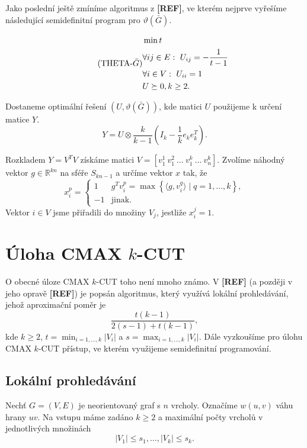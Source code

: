 Jako poslední ještě zmíníme algoritmus z \textbf{[REF]}, ve kterém nejprve vyřešíme následující semidefinitní program pro $\vartheta(\bar{G})$.

\begin{equation}\tag{THETA-$\bar{G}$}
    \begin{split}
        &\min t \\
        &\forall ij \in E:\ U_{ij} = -\frac{1}{t - 1} \\
        &\forall i \in V:\ U_{ii} = 1 \\
        &U \succeq 0, k \geq 2.
    \end{split}
    \label{eq:THETA-BAR-G}
\end{equation}

\noindent Dostaneme optimální řešení $(U, \vartheta(\bar{G}))$, kde matici $U$ použijeme k určení matice $Y$.
$$
    Y = U \otimes \frac{k}{k - 1} \left( I_k - \frac{1}{k} e_k e_k^T \right).
$$

\noindent Rozkladem $Y = V^TV$ získáme matici $V = \left[ v_1^1\ v_1^2\ \dots\ v_1^k\ \dots\ v_n^k \right]$.
Zvolíme náhodný vektor $g \in \mathbb{R}^{kn}$ na sféře $S_{kn-1}$ a určíme vektor $x$ tak, že
$$
    x_i^p = 
    \begin{cases}
        1  & g^T v_i^p = \max \left\{ \langle g, v_i^q \rangle \mid q = 1, \dots, k \right\}, \\
        -1 & \text{jinak.}
    \end{cases}
$$
Vektor $i \in V$ jsme přiřadili do množiny $V_j$, jestliže $x_i^j = 1$.


\section{Úloha CMAX $k$-CUT}

O obecné úloze CMAX $k$-CUT toho není mnoho známo. V \textbf{[REF]} (a později v jeho opravě \textbf{[REF]}) je popsán algoritmus, který využívá lokální prohledávání, jehož aproximační poměr je
$$
    \frac{t(k-1)}{2(s-1)+t(k-1)},
$$
kde $k\geq 2$, $t = \min_{i=1,\dots,k} |V_i|$ a $s = \max_{i=1,\dots,k} |V_i|$. Dále vyzkoušíme pro úlohu CMAX $k$-CUT přístup, ve kterém využijeme semidefinitní programování.

\subsection{Lokální prohledávání}

Nechť $G = (V,E)$ je neorientovaný graf s $n$ vrcholy. Označíme $w(u,v)$ váhu hrany $uv$. Na vstupu máme zadáno $k \geq 2$ a maximální počty vrcholů v jednotlivých množinách
$$
    |V_1| \leq s_1, \dots, |V_k| \leq s_k.
$$

